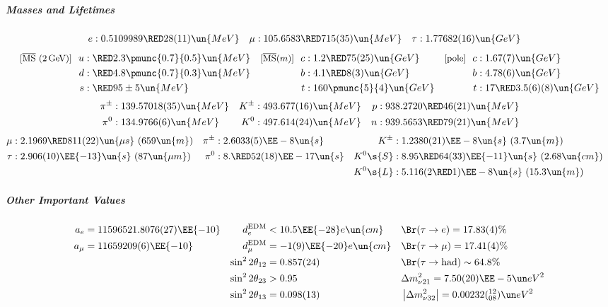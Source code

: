 \subparagraph{Masses and Lifetimes}
\begin{align*}
 e   &: 0.5109989\upd{28(11)}\un{MeV}         &
\mu  &: 105.6583\upd{715(35)}\un{MeV}         &
\tau &: 1.77682(16)\un{GeV}                   &
\end{align*}
\begin{align*}
\text{\small [$\overline{\rm MS}$ (2\,GeV)]}\ \
 u   &: \upd{2.3\pmunc{0.7}{0.5}}\un{MeV}    &
\text{\small [$\overline{\rm MS}$($m$)]}\ \
 c   &: 1.2{\upd{75(25)}}\un{GeV}             &
\text{\small [pole]}\ \
 c   &: 1.67(7)\un{GeV}
\\
 d   &: \upd{4.8\pmunc{0.7}{0.3}}\un{MeV}    &
 b   &: 4.1\upd{8(3)}\un{GeV}                 &
 b   &: 4.78(6)\un{GeV}
\\
 s   &: \upd{95\pm5}\un{MeV}                  &
 t   &: 160\pmunc{5}{4}\un{GeV}              &
 t   &: 17\upd{3.5(6)(8)}\un{GeV}
\end{align*}
\begin{align*}
 \pi^\pm &: 139.57018(35)\un{MeV}&
 K^\pm   &: 493.677(16)  \un{MeV}&
 p       &: 938.2720\upd{46(21)} \un{MeV}\\
 \pi^0   &: 134.9766(6)   \un{MeV}&
 K^0     &: 497.614(24)  \un{MeV}&
 n       &: 939.5653\upd{79(21)}\un{MeV}
\end{align*}
\begin{align*}
 \mu     &: 2.1969\upd{811(22)}   \un{\mu s} \ (659\un{m}) &
 \pi^\pm &: 2.6033(5)\EE-8        \un{s}&
 K^\pm   &: 1.2380(21)\EE-8       \un{s}     \ (3.7\un{m})\\
 \tau    &: 2.906(10)\EE{-13}     \un{s}     \ (87\un{\mu m})&
 \pi^0   &: 8.\upd{52(18)}\EE-{17}\un{s}&
 K^0\s{S}&: 8.95\upd{64}(33)\EE{-11}\un{s}   \ (2.68\un{cm})&\\
&&&&
 K^0\s{L}&: 5.116(2\upd{1})\EE-8\un{s}       \ (15.3\un{m})
\end{align*}
\subparagraph{Other Important Values}
\begin{align*}
     a_e                  &= 11596521.8076(27)\EE{-10} &
 d^{\rm EDM}_e            &< 10.5\EE{-28}e\un{cm}&
& \Br(\tau\to e)          = 17.83(4)\%
\\
     a_\mu                &= 11659209(6)\EE{-10} &
 d^{\rm EDM}_\mu          &= -1(9)\EE{-20}e\un{cm}&
& \Br(\tau\to \mu)         = 17.41(4)\%
\\
&&
 \sin^22\theta_{12} &= 0.857(24)&
& \Br(\tau\to \text{had})  \sim 64.8\%
\\
&&
 \sin^22\theta_{23} &> 0.95&
& \Delta m_{\nu21}^2 = 7.50(20)\EE-5\eV^2
\\
&&
 \sin^22\theta_{13} &= 0.098(13)&
& \left|\Delta m_{\nu32}^2\right| = 0.00232(^{12}_{08})\eV^2\\
\end{align*}
